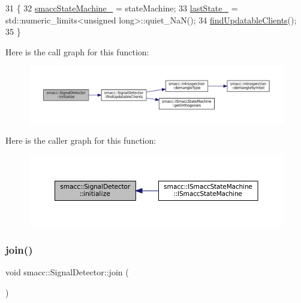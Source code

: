 \begin{DoxyCode}
31 \{
32     \hyperlink{classsmacc_1_1SignalDetector_a46025de6ac7b5980e22144f9703236a4}{smaccStateMachine\_} = stateMachine;
33     \hyperlink{classsmacc_1_1SignalDetector_a72293ed0e98f4200fbe75b53f1e41eab}{lastState\_} = std::numeric\_limits<unsigned long>::quiet\_NaN();
34     \hyperlink{classsmacc_1_1SignalDetector_a47ec2df560e2e33758ce3975bece9385}{findUpdatableClients}();
35 \}
\end{DoxyCode}
Here is the call graph for this function\+:
\nopagebreak
\begin{figure}[H]
\begin{center}
\leavevmode
\includegraphics[width=350pt]{classsmacc_1_1SignalDetector_a91ab3cd92d8095cdaf8610b50731f04b_cgraph}
\end{center}
\end{figure}
Here is the caller graph for this function\+:
\nopagebreak
\begin{figure}[H]
\begin{center}
\leavevmode
\includegraphics[width=350pt]{classsmacc_1_1SignalDetector_a91ab3cd92d8095cdaf8610b50731f04b_icgraph}
\end{center}
\end{figure}
\mbox{\label{classsmacc_1_1SignalDetector_a636f704e469bf74b4a9fdb15bd63d5be}} 
\subsubsection{\texorpdfstring{join()}{join()}}
{\footnotesize\ttfamily void smacc\+::\+Signal\+Detector\+::join (\begin{DoxyParamCaption}{ }\end{DoxyParamCaption})}

